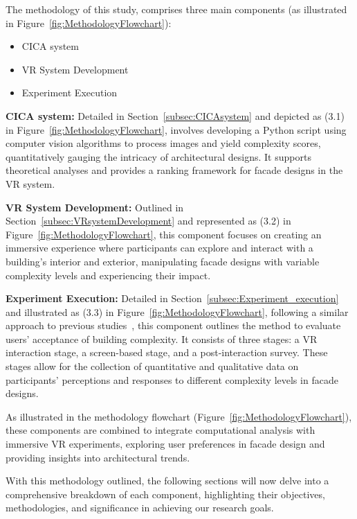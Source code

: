 The methodology of this study, comprises three main components (as illustrated in  Figure~\ref{fig:MethodologyFlowchart}):

\begin{itemize}
    \item CICA system
    \item VR System Development
    \item Experiment Execution
\end{itemize}

\textbf{CICA system:} Detailed in Section~\ref{subsec:CICAsystem} and depicted as (3.1) in Figure~\ref{fig:MethodologyFlowchart}, involves developing a Python script using computer vision algorithms to process images and yield complexity scores, quantitatively gauging the intricacy of architectural designs.
It supports theoretical analyses and provides a ranking framework for facade designs in the VR system.

\textbf{VR System Development:}  Outlined in Section~\ref{subsec:VRsystemDevelopment} and represented as (3.2) in Figure~\ref{fig:MethodologyFlowchart}, this component focuses on creating an immersive experience where participants can explore and interact with a building's interior and exterior, manipulating facade designs with variable complexity levels and experiencing their impact.

\textbf{Experiment Execution:} Detailed in Section~\ref{subsec:Experiment_execution} and illustrated as (3.3) in Figure~\ref{fig:MethodologyFlowchart}, following a similar approach to previous studies~\cite{Wolfartsberger2019}, this component outlines the method to evaluate users' acceptance of building complexity.
It consists of three stages: a VR interaction stage, a screen-based stage, and a post-interaction survey.
These stages allow for the collection of quantitative and qualitative data on participants' perceptions and responses to different complexity levels in facade designs.

As illustrated in the methodology flowchart (Figure~\ref{fig:MethodologyFlowchart}), these components are combined to integrate computational analysis with immersive VR experiments, exploring user preferences in facade design and providing insights into architectural trends.

With this methodology outlined, the following sections will now delve into a comprehensive breakdown of each component, highlighting their objectives, methodologies, and significance in achieving our research goals.


